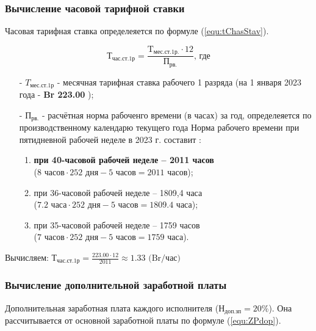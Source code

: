 \subsubsection*{Вычисление часовой тарифной ставки}

Часовая тарифная ставка определеяется по формуле (\ref{equ:tChasStav}).

\begin{equation}
    \label{equ:tChasStav}
    \text{Т}_\text{час.ст.1р} = \frac{ \text{T}_\text{мес.ст.1р.} \cdot 12 }{ \text{П}_\text{рв.} } \text{, где}
\end{equation}

\begin{enumerate}
    \item[-] $T_\text{мес.ст.1р}$ - месячная тарифная ставка рабочего 1 разряда (на 1 января 2023 года - \textbf{Br 223.00} \cite{RBstavka});
    \item[-] $\text{П}_\text{рв.}$ - расчётная норма рабоченго времени (в часах) за год,
    определеяется по производственному календарю текущего года
    Норма рабочего времени при пятидневной рабочей неделе в 2023 г. составит \cite{RBnormRabVrem}:
    \begin{enumerate}
        \item \textbf{при 40-часовой рабочей неделе – 2011 часов} \\
        ($8 \text{ часов} \cdot 252 \text{ дня} - 5 \text{ часов} = 2011 \text{ часов}$);
        \item при 36-часовой рабочей неделе – 1809,4 часа \\
        ($7.2 \text{ часа} \cdot 252 \text{ дня} - 5 \text{ часов} = 1809.4 \text{ часа}$);
        \item при 35-часовой рабочей неделе – 1759 часов \\
        ($7 \text{ часов} \cdot 252 \text{ дня} - 5 \text{ часов} = 1759 \text{ часа}$).
    \end{enumerate}
\end{enumerate}

Вычисляем: $\text{Т}_\text{час.ст.1р} = \frac{ 223.00 \cdot 12 }{ 2011 } \approx 1.33 \text{ (Br/час)}$

\subsubsection*{Вычисление дополнительной заработной платы}

Дополнительная заработная плата каждого исполнителя
($\text{Н}_\text{доп.зп} = 20\%$).
Она рассчитывается от основной заработной платы по формуле (\ref{equ:ZPdop}).

